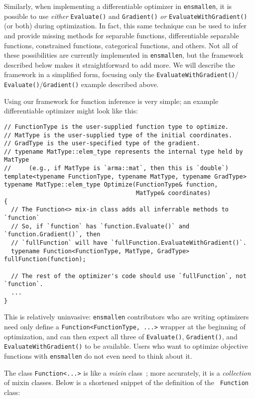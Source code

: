 Similarly, when implementing a differentiable optimizer in {\tt ensmallen}, it
is possible to use {\it either} {\tt Evaluate()} and {\tt Gradient()} {\it or}
{\tt EvaluateWithGradient()} (or both) during optimization.
In fact, this same technique can be used to infer and provide missing methods
for separable functions, differentiable separable functions, constrained
functions, categorical functions, and others.  Not all of these possibilities
are currently implemented in {\tt ensmallen}, but the framework described below
makes it straightforward to add more.  We will describe the framework in a
simplified form, focusing only the {\tt EvaluateWithGradient()}/{\tt
Evaluate()}/{\tt Gradient()} example described above.

Using our framework for function inference is very simple; an example
differentiable optimizer might look like this:

\begin{verbatim}
// FunctionType is the user-supplied function type to optimize.
// MatType is the user-supplied type of the initial coordinates.
// GradType is the user-specified type of the gradient.
// typename MatType::elem_type represents the internal type held by MatType
//     (e.g., if MatType is `arma::mat`, then this is `double`)
template<typename FunctionType, typename MatType, typename GradType>
typename MatType::elem_type Optimize(FunctionType& function,
                                     MatType& coordinates)
{
  // The Function<> mix-in class adds all inferrable methods to `function`
  // So, if `function` has `function.Evaluate()` and `function.Gradient()`, then
  // `fullFunction` will have `fullFunction.EvaluateWithGradient()`.
  typename Function<FunctionType, MatType, GradType> fullFunction(function);

  // The rest of the optimizer's code should use `fullFunction`, not `function`.
  ...
}
\end{verbatim}

This is relatively uninvasive: {\tt ensmallen} contributors who are writing
optimizers need only define a {\tt Function<FunctionType, ...>} wrapper at the
beginning of optimization, and can then expect all three of {\tt Evaluate()},
{\tt Gradient()}, and {\tt EvaluateWithGradient()} to be available.  Users who
want to optimize objective functions with {\tt ensmallen} do not even need to
think about it.

The class {\tt Function<...>} is like a {\it mixin}
class~\cite{smaragdakis2000mixin}; more accurately, it is a {\it collection} of
mixin classes.  Below is a shortened snippet of the definition of the {\tt
Function} class:

